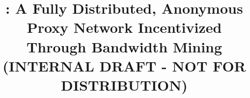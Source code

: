 \usepackage{draftwatermark}

\title{\mesh{}: A Fully Distributed, Anonymous Proxy Network Incentivized Through Bandwidth Mining (INTERNAL DRAFT - NOT FOR DISTRIBUTION)}
